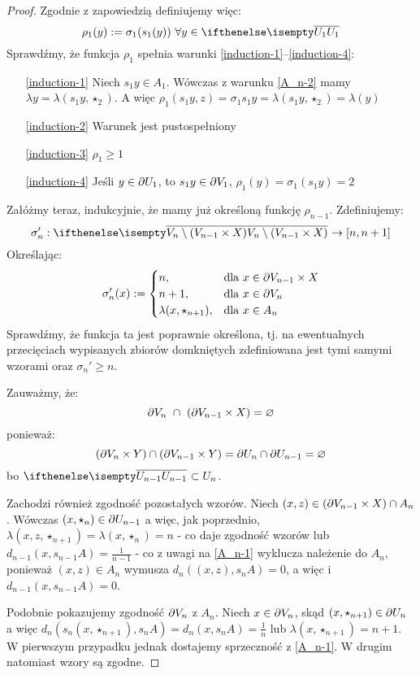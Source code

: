 \begin{thm}
\begin{proof}
  Zgodnie z zapowiedzią definiujemy więc:
  \[
    \rho_1(y) := \sigma_1(s_1(y))\ \forall y \in \cl{U_1}
  \]
  Sprawdźmy, że funkcja $\rho_1$ spełnia warunki \ref{induction-1}--\ref{induction-4}:
  \begin{enumerate}
   \item[\ref{induction-1}] Niech $s_1 y \in A_1$. Wówczas z warunku \ref{A_n-2} mamy $\lambda y = \lambda(s_1 y,\star_{2})$. A więc $\rho_1(s_1 y,z) = \sigma_1 s_1 y = \lambda(s_1 y,\star_2) = \lambda(y)$
   \item[\ref{induction-2}] Warunek jest pustospełniony
   \item[\ref{induction-3}] $\rho_1 \geq 1$
   \item[\ref{induction-4}] Jeśli $y\in\partial U_1$, to $s_1 y\in\partial V_1$, $\rho_1(y) = \sigma_1(s_1 y) = 2$
  \end{enumerate}
  Załóżmy teraz, indukcyjnie, że mamy już określoną funkcję $\rho_{n-1}$. Zdefiniujemy:  
  \[
    \sigma_n': \cl{V_n \setminus (V_{n-1} \times X)} \rightarrow [n,n+1]
  \]
  Określając:
  \[
  \sigma_n'(x) := 
    \begin{cases}
      n,&\mbox{dla }x \in \partial V_{n-1} \times X \\
      n+1,&\mbox{dla }x \in \partial V_n \\
      \lambda(x, \star_{n+1}),&\mbox{dla }x \in A_n
    \end{cases}
  \]
  Sprawdźmy, że funkcja ta jest poprawnie określona, tj. na ewentualnych przecięciach wypisanych zbiorów domkniętych zdefiniowana jest tymi samymi wzorami oraz $\sigma_n' \geq n$.
  
  Zauważmy, że:
  \[
    \partial V_n\ \cap\ (\partial V_{n-1} \times X) = \varnothing
  \]
  ponieważ:
  \[
    (\partial V_n \times Y) \cap (\partial V_{n-1} \times Y) = \partial U_n \cap \partial U_{n-1} = \varnothing
  \]
  bo $\cl{U_{n-1}} \subset U_n$.
  
  Zachodzi również zgodność pozostałych wzorów. Niech $(x, z) \in (\partial V_{n-1} \times X) \cap A_n$. Wówczas $(x, \star_n) \in \partial U_{n-1}$ a więc, jak poprzednio, $\lambda(x, z, \star_{n+1}) = \lambda(x, \star_n) = n$ - co daje zgodność wzorów lub $d_{n-1}(x, s_{n-1} A) = \frac{1}{n-1}$ - co z uwagi na \ref{A_n-1} wyklucza należenie do $A_n$, ponieważ $(x, z) \in A_n$ wymusza $d_{n}((x, z), s_{n} A) = 0$, a więc i $d_{n-1}(x, s_{n-1} A) = 0$.
  
  Podobnie pokazujemy zgodność $\partial V_n$ z $A_n$. Niech $x \in \partial V_n$, skąd $(x,\star_{n+1})\in\partial U_n$ a więc $d_n(s_n(x,\star_{n+1}), s_n A) = d_n(x,s_n A) = \frac{1}{n}$ lub $\lambda(x,\star_{n+1}) = n+1$. W pierwszym przypadku jednak dostajemy sprzeczność z \ref{A_n-1}. W drugim natomiast wzory są zgodne.
  

\end{proof}
\end{thm}
